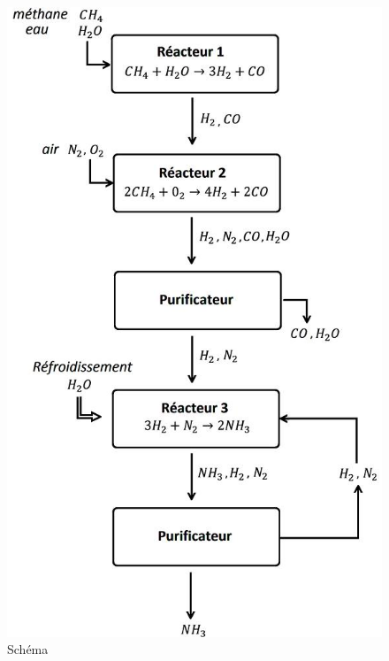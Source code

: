 \documentclass[11pt,a4paper]{report}
\begin{document}
\begin{figure}[ht!]
 \centering
 \includegraphics[scale=0.6]{flowsheet.jpg}
 \caption{Schéma}
 \label{scheme}
 
\end{figure}
\end{document}
